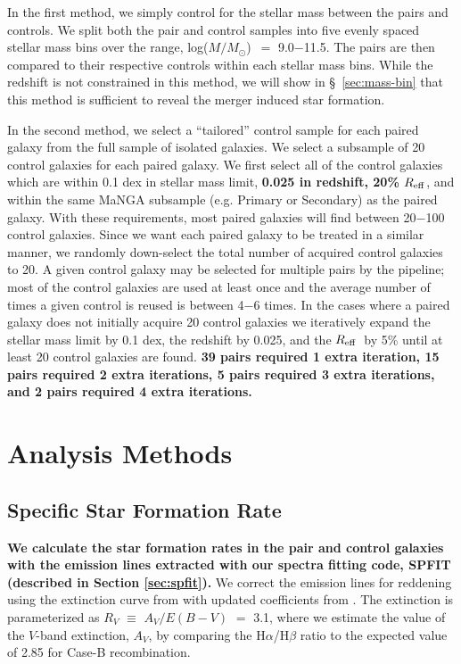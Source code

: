 \documentclass[iop,revtex4,twocolumn,apj,numberedappendix,appendixfloats]{emulateapj}
\newcommand{\reff}{$R_{\rm eff}$}
\newcommand{\logm}{log($M/M_{\odot}$)}
\begin{document}
In the first method, we simply control for the stellar mass between the pairs and controls. We split both the pair and control samples into five evenly spaced stellar mass bins over the range, \logm\ $=$ 9.0$-$11.5. The pairs are then compared to their respective controls within each stellar mass bins. While the redshift is not constrained in this method, we will show in \S~\ref{sec:mass-bin} that this method is sufficient to reveal the merger induced star formation. 

In the second method, we select a ``tailored'' control sample for each paired galaxy from the full sample of isolated galaxies. We select a subsample of 20 control galaxies for each paired galaxy. We first select all of the control galaxies which are within 0.1 dex in stellar mass limit, \textbf{0.025 in redshift, 20\% \reff}, and within the same MaNGA subsample (e.g. Primary or Secondary) as the paired galaxy. With these requirements, most paired galaxies will find between 20$-$100 control galaxies. Since we want each paired galaxy to be treated in a similar manner, we randomly down-select the total number of acquired control galaxies to 20. A given control galaxy may be selected for multiple pairs by the pipeline; most of the control galaxies are used at least once and the average number of times a given control is reused is between 4$-$6 times. In the cases where a paired galaxy does not initially acquire 20 control galaxies we iteratively expand the stellar mass limit by 0.1 dex, the redshift by 0.025, and the \reff\ by 5\% until at least 20 control galaxies are found. \textbf{39 pairs required 1 extra iteration, 15 pairs required 2 extra iterations, 5 pairs required 3 extra iterations, and 2 pairs required 4 extra iterations. }

\section{Analysis Methods}\label{sec:analysis}

\subsection{Specific Star Formation Rate}
\textbf{We calculate the star formation rates in the pair and control galaxies with the emission lines extracted with our spectra fitting code, {\sc SPFIT} (described in Section \ref{sec:spfit}).} We correct the emission lines for reddening using the extinction curve from \citet{Cardelli:1989} with updated coefficients from \citet{ODonnell:1994}. The extinction is parameterized as $R_V$ $\equiv$ $A_V/E(B-V)$ $=$ 3.1, where we estimate the value of the $V$-band extinction, $A_V$, by comparing the H$\alpha$/H$\beta$ ratio to the expected value of 2.85 for Case-B recombination. 
\end{document}
